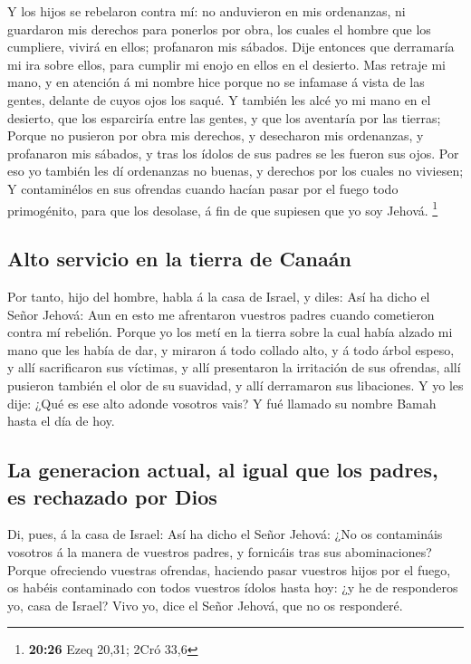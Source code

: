  Y los hijos se rebelaron contra mí: no anduvieron en mis
ordenanzas, ni guardaron mis derechos para ponerlos por obra, los cuales
el hombre que los cumpliere, vivirá en ellos; profanaron mis sábados.
Dije entonces que derramaría mi ira sobre ellos, para cumplir mi enojo
en ellos en el desierto.  Mas retraje mi mano, y en
atención á mi nombre hice porque no se infamase á vista de las gentes,
delante de cuyos ojos los saqué.  Y también les alcé yo mi
mano en el desierto, que los esparciría entre las gentes, y que los
aventaría por las tierras;  Porque no pusieron por obra mis
derechos, y desecharon mis ordenanzas, y profanaron mis sábados, y tras
los ídolos de sus padres se les fueron sus ojos.  Por eso
yo también les dí ordenanzas no buenas, y derechos por los cuales no
viviesen;  Y contaminélos en sus ofrendas cuando hacían
pasar por el fuego todo primogénito, para que los desolase, á fin de que
supiesen que yo soy Jehová. \footnote{\textbf{20:26} Ezeq 20,31; 2Cró
  33,6}

\hypertarget{alto-servicio-en-la-tierra-de-canauxe1n}{%
\subsection{Alto servicio en la tierra de
Canaán}\label{alto-servicio-en-la-tierra-de-canauxe1n}}

 Por tanto, hijo del hombre, habla á la casa de Israel, y
diles: Así ha dicho el Señor Jehová: Aun en esto me afrentaron vuestros
padres cuando cometieron contra mí rebelión.  Porque yo los
metí en la tierra sobre la cual había alzado mi mano que les había de
dar, y miraron á todo collado alto, y á todo árbol espeso, y allí
sacrificaron sus víctimas, y allí presentaron la irritación de sus
ofrendas, allí pusieron también el olor de su suavidad, y allí
derramaron sus libaciones.  Y yo les dije: ¿Qué es ese alto
adonde vosotros vais? Y fué llamado su nombre Bamah hasta el día de hoy.

\hypertarget{la-generacion-actual-al-igual-que-los-padres-es-rechazado-por-dios}{%
\subsection{La generacion actual, al igual que los padres, es rechazado
por
Dios}\label{la-generacion-actual-al-igual-que-los-padres-es-rechazado-por-dios}}

 Di, pues, á la casa de Israel: Así ha dicho el Señor
Jehová: ¿No os contamináis vosotros á la manera de vuestros padres, y
fornicáis tras sus abominaciones?  Porque ofreciendo
vuestras ofrendas, haciendo pasar vuestros hijos por el fuego, os habéis
contaminado con todos vuestros ídolos hasta hoy: ¿y he de responderos
yo, casa de Israel? Vivo yo, dice el Señor Jehová, que no os responderé.


